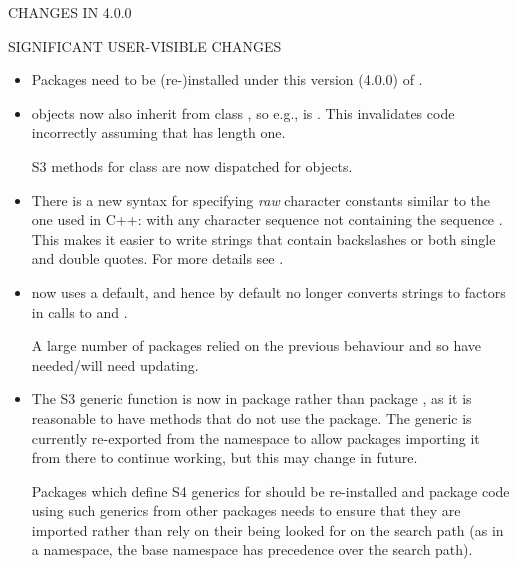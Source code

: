 \documentclass[letterpaper]{book}
\begin{document}
%
\begin{Section}{ CHANGES IN 4.0.0}

%
\begin{SubSection}{SIGNIFICANT USER-VISIBLE CHANGES}
\begin{itemize}

\item{} Packages need to be (re-)installed under this version
(4.0.0) of \R{}.

\item{}  objects now also inherit from class
, so e.g.,  is .  This invalidates code incorrectly assuming that
 has length one.

S3 methods for class  are now dispatched for
 objects.

\item{} There is a new syntax for specifying \emph{raw} character
constants similar to the one used in C++:  with
 any character sequence not containing the sequence
. 
This makes it easier to write strings that contain backslashes or
both single and double quotes.  For more details see .

\item{} \R{} now uses a  default, and
hence by default no longer converts strings to factors in calls
to  and .

A large number of packages relied on the previous behaviour and
so have needed/will need updating.

\item{} The  S3 generic function is now in package
 rather than package , as it is
reasonable to have methods that do not use the 
package.  The generic is currently re-exported from the
 namespace to allow packages importing it from
there to continue working, but this may change in future.

Packages which define S4 generics for  should be
re-installed and package code using such generics from other
packages needs to ensure that they are imported rather than rely
on their being looked for on the search path (as in a namespace,
the base namespace has precedence over the search path).

\end{itemize}



\end{SubSection}
\end{Section}
\end{document}
